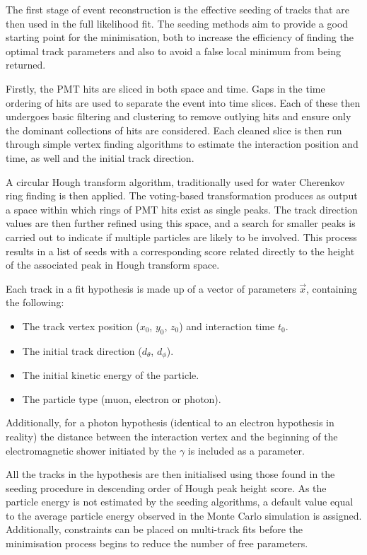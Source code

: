 The first stage of event reconstruction is the effective seeding of tracks that are then used in
the full likelihood fit. The seeding methods aim to provide a good starting point for the
minimisation, both to increase the efficiency of finding the optimal track parameters and also to
avoid a false local minimum from being returned.

Firstly, the PMT hits are sliced in both space and time. Gaps in the time ordering of hits are
used to separate the event into time slices. Each of these then undergoes basic filtering and
clustering to remove outlying hits and ensure only the dominant collections of hits are
considered. Each cleaned slice is then run through simple vertex finding algorithms to estimate
the interaction position and time, as well and the initial track direction.

A circular Hough transform algorithm, traditionally used for water Cherenkov ring finding is then
applied. The voting-based transformation produces as output a space within which rings of PMT hits
exist as single peaks. The track direction values are then further refined using this space, and a
search for smaller peaks is carried out to indicate if multiple particles are likely to be
involved. This process results in a list of seeds with a corresponding score related directly to
the height of the associated peak in Hough transform space.

Each track in a fit hypothesis is made up of a vector of parameters $\vec{x}$, containing the
following:
\begin{itemize}
    \item The track vertex position ($x_{0}$, $y_{0}$, $z_{0}$) and interaction time $t_{0}$.
    \item The initial track direction ($d_{\theta}$, $d_{\phi}$).
    \item The initial kinetic energy of the particle.
    \item The particle type (muon, electron or photon).
\end{itemize}
Additionally, for a photon hypothesis (identical to an electron hypothesis in reality) the
distance between the interaction vertex and the beginning of the electromagnetic shower initiated
by the $\gamma$ is included as a parameter.

All the tracks in the hypothesis are then initialised using those found in the seeding procedure
in descending order of Hough peak height score. As the particle energy is not estimated by the
seeding algorithms, a default value equal to the average particle energy observed in the Monte
Carlo simulation is assigned. Additionally, constraints can be placed on multi-track fits before
the minimisation process begins to reduce the number of free parameters.

